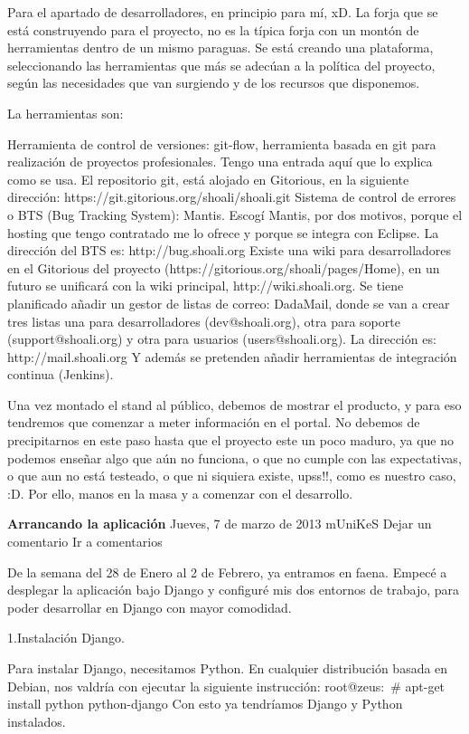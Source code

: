 \documentclass[a4paper, 12pt]{book}
\begin{document}
Para el apartado de desarrolladores, en principio para mí, xD. La forja que se está construyendo para el proyecto, no es la típica forja con un montón de herramientas dentro de un mismo paraguas. Se está creando una plataforma, seleccionando las herramientas que más se adecúan a la política del proyecto, según las necesidades que van surgiendo y de los recursos que disponemos.

La herramientas son:

    Herramienta de control de versiones: git-flow, herramienta basada en git para realización de proyectos profesionales. Tengo una entrada aquí que lo explica como se usa. El repositorio git, está alojado en Gitorious, en la siguiente dirección: https://git.gitorious.org/shoali/shoali.git
    Sistema de control de errores o BTS (Bug Tracking System): Mantis. Escogí Mantis, por dos motivos, porque el hosting que tengo contratado me lo ofrece y porque se integra con Eclipse. La dirección del BTS es: http://bug.shoali.org
    Existe una wiki para desarrolladores en el Gitorious del proyecto (https://gitorious.org/shoali/pages/Home), en un futuro se unificará con la wiki principal, http://wiki.shoali.org.
    Se tiene planificado añadir un gestor de listas de correo: DadaMail, donde se van a crear tres listas una para desarrolladores (dev@shoali.org), otra para soporte (support@shoali.org) y otra para usuarios (users@shoali.org). La dirección es: http://mail.shoali.org
    Y además se pretenden añadir herramientas de integración continua (Jenkins).

Una vez montado el stand al público, debemos de mostrar el producto, y para eso tendremos que comenzar a meter información en el portal. No debemos de precipitarnos en este paso hasta que el proyecto este un poco maduro, ya que no podemos enseñar algo que aún no funciona, o que no cumple con las expectativas, o que aun no está testeado,  o que ni siquiera existe, upss!!, como es nuestro caso, :D. Por ello, manos en la masa y a comenzar con el desarrollo.


\textbf{Arrancando la aplicación}
Jueves, 7 de marzo de 2013 mUniKeS      Dejar un comentario Ir a comentarios

De la semana del 28 de Enero al 2 de Febrero, ya entramos en faena. Empecé a desplegar la aplicación bajo Django y configuré mis dos entornos de trabajo, para poder desarrollar en Django con mayor comodidad.

1.Instalación Django.

Para instalar Django, necesitamos Python. En cualquier distribución basada en Debian, nos valdría con ejecutar la siguiente instrucción:
root@zeus:~# apt-get install python python-django
Con esto ya tendríamos Django y Python instalados.
\end{document}
